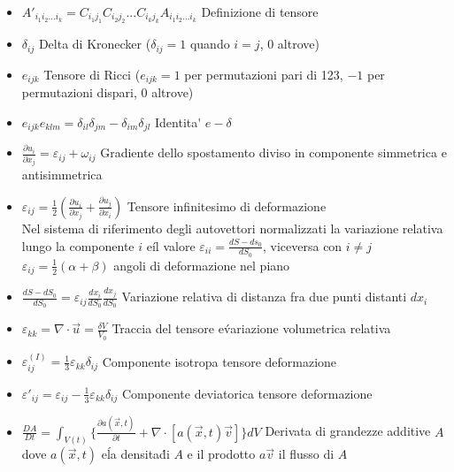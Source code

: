 \documentclass[a4paper]{article}
\begin{document}
\begin{itemize}
	\item $A'_{i_1i_2...i_k}=C_{i_1j_1}C_{i_2j_2}...C_{i_kj_k}A_{i_1i_2...i_k}$ Definizione di tensore
	
	\item $\delta_{ij}$ Delta di Kronecker ($\delta_{ij} = 1$ quando $i=j$, $0$ altrove)
	
	\item $e_{ijk}$ Tensore di Ricci ($e_{ijk}=1$ per permutazioni pari di 123, $-1$ per permutazioni dispari, $0$ altrove)
	
	\item $e_{ijk}e_{klm}=\delta_{il}\delta_{jm}-\delta_{im}\delta_{jl}$ Identita\' $e-\delta$
	
	\item $\frac{\partial u_i}{\partial x_j} = \varepsilon_{ij}+\omega_{ij}$ Gradiente dello spostamento diviso in componente simmetrica e antisimmetrica
	
	\item $\varepsilon_{ij}=\frac{1}{2}(\frac{\partial u_i}{\partial x_j}+\frac{\partial u_j}{\partial x_i})$ Tensore infinitesimo di deformazione\\
	Nel sistema di riferimento degli autovettori normalizzati la variazione relativa lungo la componente $i$ e\' il valore $\varepsilon_{ii} = \frac{dS-ds_0}{dS_0}$, viceversa con $i \neq j$  $\varepsilon_{ij}=\frac{1}{2}(\alpha + \beta)$ angoli di deformazione nel piano
	
	\item $\frac{dS-dS_0}{dS_0}=\varepsilon_{ij} \frac{dx_i}{dS_0} \frac{dx_j}{dS_0}$ Variazione relativa di distanza fra due punti distanti $dx_i$
	
	\item $ \varepsilon_{kk}=\nabla \cdot \overrightarrow{u} = \frac{\delta V}{V_0}$ Traccia del tensore e\' variazione volumetrica relativa
	
	\item $\varepsilon^{(I)}_{ij} = \frac{1}{3} \varepsilon_{kk}\delta_{ij}$ Componente isotropa tensore deformazione
	
	\item $\varepsilon'_{ij} = \varepsilon_{ij} -\frac{1}{3} \varepsilon_{kk}\delta_{ij}$ Componente deviatorica tensore deformazione
	
	\item $\frac{DA}{Dt}=\int_{V(t)} \{ \frac{\partial a(\overrightarrow{x},t)}{\partial t} + \nabla \cdot [a(\overrightarrow{x}, t)\overrightarrow{v}] \} dV$ Derivata di grandezze additive $A$ dove $a(\overrightarrow{x},t)$ e\' la densita\' di $A$ e il prodotto $a \overrightarrow{v}$ il flusso di $A$
	

\end{itemize}
\end{document}

